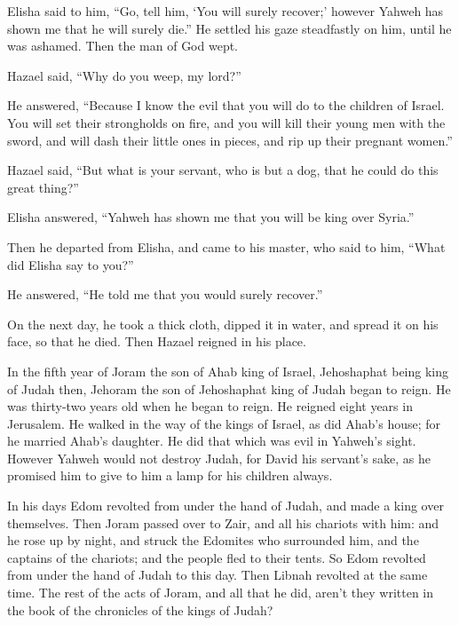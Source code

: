 {\par }{\PP {}Elisha said to him, “Go, tell him, ‘You will surely recover;’ however Yahweh has shown me that he will surely die.”
He settled his gaze steadfastly on him, until he was ashamed. Then the man of God wept.
\par }{\PP {}Hazael said, “Why do you weep, my lord?”
\par }{\PP He answered, “Because I know the evil that you will do to the children of Israel. You will set their strongholds on fire, and you will kill their young men with the sword, and will dash their little ones in pieces, and rip up their pregnant women.”
\par }{\PP {}Hazael said, “But what is your servant, who is but a dog, that he could do this great thing?”
\par }{\PP Elisha answered, “Yahweh has shown me that you will be king over Syria.”
\par }{\PP {}Then he departed from Elisha, and came to his master, who said to him, “What did Elisha say to you?”
\par }{\PP He answered, “He told me that you would surely recover.”
\par }{\PP {}On the next day, he took a thick cloth, dipped it in water, and spread it on his face, so that he died. Then Hazael reigned in his place.
\par }{\PP {}In the fifth year of Joram the son of Ahab king of Israel, Jehoshaphat being king of Judah then, Jehoram the son of Jehoshaphat king of Judah began to reign.
He was thirty-two years old when he began to reign. He reigned eight years in Jerusalem.
He walked in the way of the kings of Israel, as did Ahab’s house; for he married Ahab’s daughter. He did that which was evil in Yahweh’s sight.
However Yahweh would not destroy Judah, for David his servant’s sake, as he promised him to give to him a lamp for his children always.
\par }{\PP {}In his days Edom revolted from under the hand of Judah, and made a king over themselves.
Then Joram passed over to Zair, and all his chariots with him: and he rose up by night, and struck the Edomites who surrounded him, and the captains of the chariots; and the people fled to their tents.
So Edom revolted from under the hand of Judah to this day. Then Libnah revolted at the same time.
The rest of the acts of Joram, and all that he did, aren’t they written in the book of the chronicles of the kings of Judah?
}
